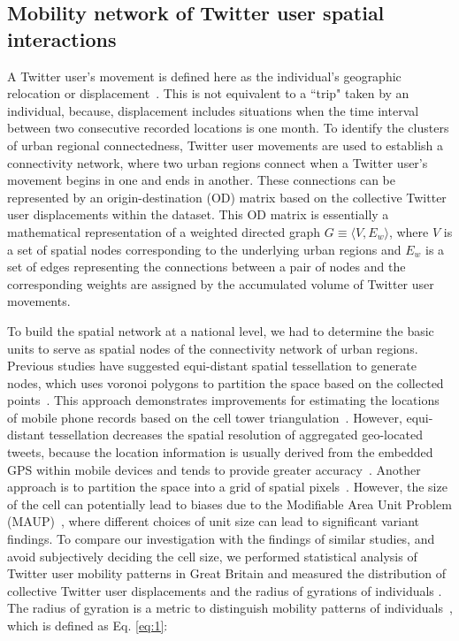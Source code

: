\documentclass[]{tGIS2e}
\begin{document}
\subsection{Mobility network of Twitter user spatial interactions}
A Twitter user's movement is defined here as the individual's geographic relocation or displacement~\citep{gonzalez2008}.
This is not equivalent to a ``trip" taken by an individual, because, displacement includes situations when the time interval between two consecutive recorded locations is one month.
To identify the clusters of urban regional connectedness, Twitter user movements are used to establish a connectivity network, where two urban regions connect when a Twitter user's movement begins in one and ends in another.
These connections can be represented by an origin-destination (OD) matrix based on the collective Twitter user displacements within the dataset.
This OD matrix is essentially a mathematical representation of a weighted directed graph $G\equiv\langle V, E_{w}\rangle$, where $V$ is a set of spatial nodes corresponding to the underlying urban regions and $E_{w}$ is a set of edges representing the connections between a pair of nodes and the corresponding weights are assigned by the accumulated volume of Twitter user movements.

To build the spatial network at a national level, we had to determine the basic units to serve as spatial nodes of the connectivity network of urban regions.
Previous studies have suggested equi-distant spatial tessellation to generate nodes, which uses voronoi polygons to partition the space based on the collected points~\citep{rinzivillo2012,zhong2014}. 
This approach demonstrates improvements for estimating the locations of mobile phone records based on the cell tower triangulation~\citep{gonzalez2008,qian2013}.
However, equi-distant tessellation decreases the spatial resolution of aggregated geo-located tweets, because the location information is usually derived from the embedded GPS within mobile devices and tends to provide greater accuracy~\citep{zandbergen2009}.
Another approach is to partition the space into a grid of spatial pixels~\citep{liuPopMobility,ratti2010}.
However, the size of the cell can potentially lead to biases due to the Modifiable Area Unit Problem (MAUP)~\citep{openshaw1984,wong2009}, where different choices of unit size can lead to significant variant findings. 
To compare our investigation with the findings of similar studies, and avoid subjectively deciding the cell size, we performed statistical analysis of Twitter user mobility patterns in Great Britain and measured the distribution of collective Twitter user displacements and the radius of gyrations of individuals \citep{gonzalez2008,jurdak2015}.
The radius of gyration is a metric to distinguish mobility patterns of individuals~\citep{gonzalez2008}, which is defined as Eq. \eqref{eq:1}:
\end{document}
